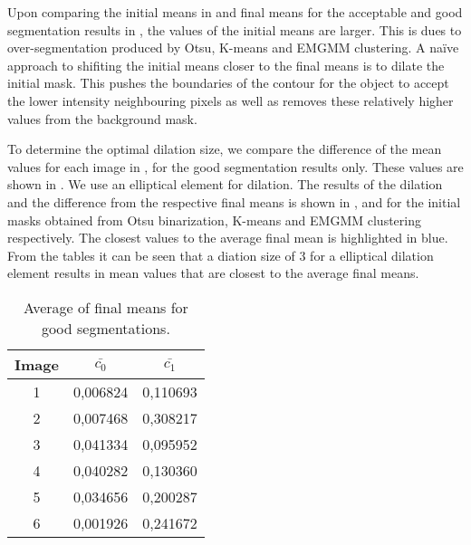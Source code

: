 Upon comparing the initial means in  and final means for the acceptable and good segmentation results in , the values of the initial means are larger. This is dues to over-segmentation produced by Otsu, K-means and EMGMM clustering. A na{\"i}ve approach to shifiting the initial means closer to the final means is to dilate the initial mask. This pushes the boundaries of the contour for the object to accept the lower intensity neighbouring pixels as well as removes these relatively higher values from the background mask.

To determine the optimal dilation size, we compare the difference of the mean values for each image in , for the good segmentation results only. These values are shown in . We use an elliptical element for dilation. The results of the dilation and the difference from the respective final means is shown in ,  and  for the initial masks obtained from Otsu binarization, K-means and EMGMM clustering respectively. The closest values to the average final mean is highlighted in blue. From the tables it can be seen that a diation size of 3 for a elliptical dilation element results in mean values that are closest to the average final means.

\begin{table}
	\centering
	\caption{Average of final means for good segmentations.}
	\begin{tabular}{|c|c|c|}
		\hline 
		Image & $\bar{c_0}$ & $\bar{c_1}$ \\ 
		\hline 
		1 & 0,006824 & 0,110693 \\ 
		\hline 
		2 & 0,007468 & 0,308217 \\ 
		\hline 
		3 & 0,041334 & 0,095952 \\ 
		\hline 
		4 & 0,040282 & 0,130360 \\ 
		\hline 
		5 & 0,034656 & 0,200287 \\ 
		\hline 
		6 & 0,001926 & 0,241672 \\ 
		\hline 
	\end{tabular}
	\label{tab:meanofmeans}
\end{table}


